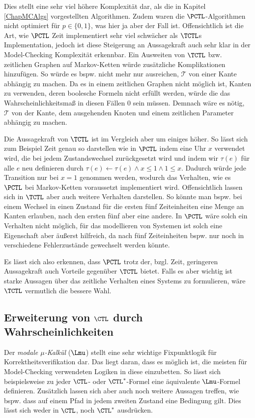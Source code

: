 Dies stellt eine sehr viel höhere Komplexität dar, als die in Kapitel \ref{ChapMCAlgs} vorgestellten Algorithmen.
Zudem waren die $\PCTL$-Algorithmen nicht optimiert für $p\in \{0,1\}$, was hier ja aber der Fall ist.
Offensichtlich ist die Art, wie $\PCTL$ Zeit implementiert sehr viel schwächer als $\TCTL$s Implementation, jedoch ist diese Steigerung an Aussagekraft auch sehr klar in der Model-Checking Komplexität erkennbar.
Ein Ausweiten von $\TCTL$ bzw. zeitlichen Graphen auf Markov-Ketten würde zusätzliche Komplikationen hinzufügen.
So würde es bspw. nicht mehr nur ausreichen, $\mathcal{T}$ von einer Kante abhängig zu machen.
Da es in einem zeitlichen Graphen nicht möglich ist, Kanten zu verwenden, deren boolesche Formeln nicht erfüllt werden, würde die das Wahrscheinlichkeitsmaß in diesen Fällen $0$ sein müssen.
Demnach wäre es nötig, $\mathcal{T}$ von der Kante, dem ausgehenden Knoten und einem zeitlichen Parameter abhängig zu machen.

Die Aussagekraft von $\TCTL$ ist im Vergleich aber um einiges höher.
So lässt sich zum Beispiel Zeit genau so darstellen wie in $\PCTL$ indem eine Uhr $x$ verwendet wird, die bei jedem Zustandswechsel zurückgesetzt wird und indem wir $\tau(e)$ für alle $e$ neu definieren durch $\tau(e)\gets \tau(e) \land x\leq 1 \land 1\leq x$.
Dadurch würde jede Transition nur bei $x=1$ genommen werden, wodurch das Verhalten, wie es $\PCTL$ bei Markov-Ketten voraussetzt implementiert wird.
Offensichtlich lassen sich in $\TCTL$ aber auch weitere Verhalten darstellen.
So könnte man bspw. bei einem Wechsel in einen Zustand für die ersten fünf Zeiteinheiten eine Menge an Kanten erlauben, nach den ersten fünf aber eine andere.
In $\PCTL$ wäre solch ein Verhalten nicht möglich, für das modellieren von Systemen ist solch eine Eigenschaft aber äußerst hilfreich, da nach fünf Zeiteinheiten bspw. nur noch in verschiedene Fehlerzustände gewechselt werden könnte.

Es lässt sich also erkennen, dass $\PCTL$ trotz der, bzgl. Zeit, geringeren Aussagekraft auch Vorteile gegenüber $\TCTL$ bietet.
Falls es aber wichtig ist starke Aussagen über das zeitliche Verhalten eines Systems zu formulieren, wäre $\TCTL$ vermutlich die bessere Wahl.


\subsection{Erweiterung von $\CTL$ durch Wahrscheinlichkeiten}

Der \textit{modale $\mu$-Kalkül} ($\Lmu$) stellt eine sehr wichtige Fixpunktlogik für Korrektheitsverifikation dar.
Das liegt daran, dass es möglich ist, die meisten für Model-Checking verwendeten Logiken in diese einzubetten. So lässt sich beispielsweise zu jeder $\CTL$- oder $\CTL^*$-Formel eine äquivalente $\Lmu$-Formel definieren.
Zusätzlich lassen sich aber auch noch weitere Aussagen treffen, wie bspw. dass auf einem Pfad in jedem zweiten Zustand eine Bedingung gilt.
Dies lässt sich weder in $\CTL$, noch $\CTL^*$ ausdrücken. \cite{cleaveland2005probabilistic}

